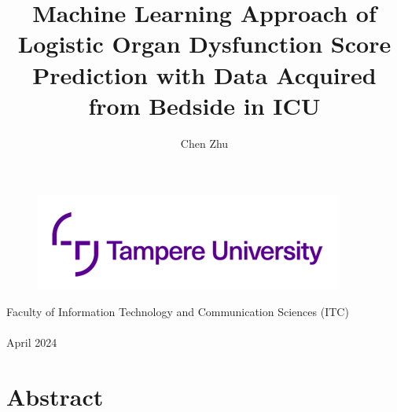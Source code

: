 \documentclass[12pt,a4paper,english
]{tunithesis}
\author{Chen Zhu}
\title{Machine Learning Approach of Logistic Organ Dysfunction Score Prediction with Data Acquired from Bedside in ICU} %
\begin{document}
\makeatletter



%
\thispagestyle{empty}
\vspace*{-.5cm}\noindent

\begin{figure}
    \vspace{-1.3cm}
    \advance\leftskip-2.5cm
    \noindent\includegraphics{img/tunilogo.png}
\end{figure}
 
\vspace{2.5cm}
\begin{flushright}
\noindent\textsf{\LARGE{\@author}}

\noindent\vspace{0.5cm}

\noindent\Huge{\textsf{\textbf{\textcolor{tunipurple}{\@title}}}}
\end{flushright}
\vspace{10.7cm} %

\begin{flushright}  
    \begin{spacing}{1.0}
      \textsf{Faculty of Information Technology and Communication Sciences (ITC)\\
      \@thesistype\\
      April 2024}
    \end{spacing}
\end{flushright}

\if@twoside
\clearpage
\fi




\chapter*{Abstract}
\end{document}
